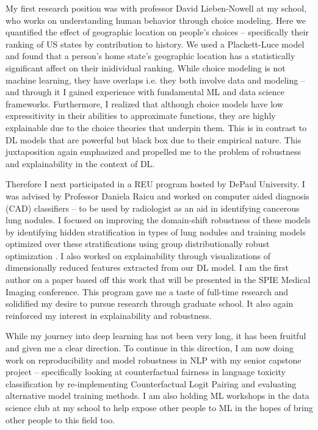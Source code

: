 \documentclass[12pt]{article}
\begin{document}
My first research position was with professor David Lieben-Nowell at my school, who works on understanding human behavior through choice modeling. Here we quantified the effect of geographic location on people's choices -- specifically their ranking of US states by contribution to history. We used a Plackett-Luce model and found that a person's home state's geographic location has a statistically significant affect on their inidividual ranking.
While choice modeling is not machine learning, they have overlaps i.e. they both involve data and modeling -- and through it I gained experience with fundamental ML and data science frameworks. 
Furthermore, I realized that although choice models have low expressitivity in their abilities to approximate functions, they are highly explainable due to the choice theories that underpin them. This is in contrast to DL models that are powerful but black box due to their empirical nature. This juxtaposition again emphasized and propelled me to the problem of robustness and explainability in the context of DL.

 Therefore I next participated in a REU program hosted by DePaul University. I was advised by Professor Daniela Raicu and worked on computer aided diagnosis (CAD) classifiers -- to be used by radiologist as an aid in identifying cancerous lung nodules. I focused on improving the domain-shift robustness of these models by identifying hidden stratification in types of lung nodules and training models optimized over these stratifications using group distributionally robust optimization \cite{Sagawa*2020Distributionally}. I also worked on explainability through visualizations of dimensionally reduced features extracted from our DL model. I am the first author on a paper based off this work that will be presented in the SPIE Medical Imaging conference. This program gave me a taste of full-time research and solidified my desire to pursue research through graduate school.
It also again reinforced my interest in explainability and robustness.
 
While my journey into deep learning has not been very long, it has been fruitful and given me a clear direction.
To continue in this direction, I am now doing work on reproducibility and model robustness in NLP with my senior capstone project -- specifically looking at counterfactual fairness in language toxicity classification by re-implementing Counterfactual Logit Pairing \cite{garg2019counterfactual} and evaluating alternative model training methods. I am also holding ML workshops in the data science club at my school to help expose other people to ML in the hopes of bring other people to this field too.
\end{document}

